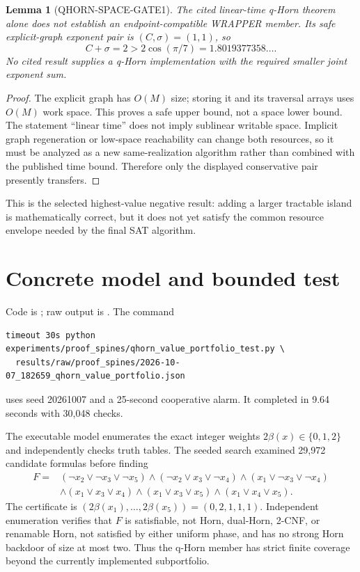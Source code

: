 \documentclass[11pt]{article}
\newtheorem{lemma}{Lemma}
\begin{document}
\begin{lemma}[QHORN-SPACE-GATE1]
The cited linear-time q-Horn theorem alone does not establish an
endpoint-compatible WRAPPER member.  Its safe explicit-graph exponent pair
is $(C,\sigma)=(1,1)$, so
\[
 C+\sigma=2>2\cos(\pi/7)=1.8019377358\ldots.
\]
No cited result supplies a q-Horn implementation with the required smaller
joint exponent sum.
\end{lemma}
\begin{proof}
The explicit graph has $O(M)$ size; storing it and its traversal arrays uses
$O(M)$ work space.  This proves a safe upper bound, not a space lower bound.
The statement ``linear time'' does not imply sublinear writable space.
Implicit graph regeneration or low-space reachability can change both
resources, so it must be analyzed as a new same-realization algorithm rather
than combined with the published time bound.  Therefore only the displayed
conservative pair presently transfers.
\end{proof}

This is the selected highest-value negative result: adding a larger tractable
island is mathematically correct, but it does not yet satisfy the common
resource envelope needed by the final SAT algorithm.

\section{Concrete model and bounded test}
Code is
; raw output is
.
The command
\begin{verbatim}
timeout 30s python experiments/proof_spines/qhorn_value_portfolio_test.py \
  results/raw/proof_spines/2026-10-07_182659_qhorn_value_portfolio.json
\end{verbatim}
uses seed 20261007 and a 25-second cooperative alarm.  It completed in
9.64 seconds with 30,048 checks.

The executable model enumerates the exact integer weights
$2\beta(x)\in\{0,1,2\}$ and independently checks truth tables.  The seeded
search examined 29,972 candidate formulas before finding
\[
\begin{split}
F={}&(\neg x_2\vee\neg x_3\vee\neg x_5)
\wedge(\neg x_2\vee x_3\vee\neg x_4)
\wedge(x_1\vee\neg x_3\vee\neg x_4)\\
&\wedge(x_1\vee x_3\vee x_4)
\wedge(x_1\vee x_3\vee x_5)
\wedge(x_1\vee x_4\vee x_5).
\end{split}
\]
The certificate is
$(2\beta(x_1),\ldots,2\beta(x_5))=(0,2,1,1,1)$.
Independent enumeration verifies that $F$ is satisfiable, not Horn,
dual-Horn, 2-CNF, or renamable Horn, not satisfied by either uniform phase,
and has no strong Horn backdoor of size at most two.  Thus the q-Horn member
has strict finite coverage beyond the currently implemented subportfolio.
\end{document}
